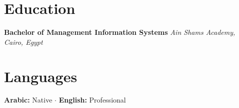 \documentclass[10pt,a4paper]{article}
\begin{document}


    \section{Education}\label{sec:education}
    \textbf{Bachelor of Management Information Systems} \hfill \textit{Ain Shams Academy, Cairo, Egypt}



    \section{Languages}\label{sec:languages}
    \textbf{Arabic:} Native \quad $\cdot$ \quad \textbf{English:} Professional
\end{document}
